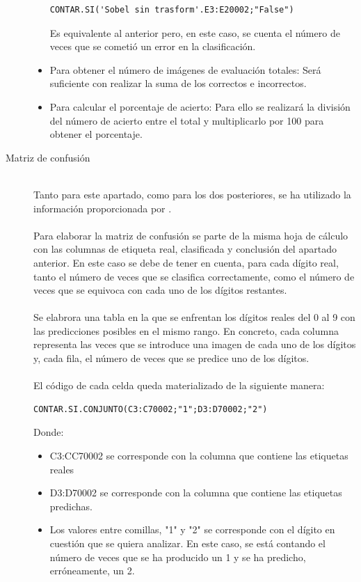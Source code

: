 \begin{description}
\begin{itemize}
{		\begin{lstlisting}[frame=single]
			CONTAR.SI('Sobel sin trasform'.E3:E20002;"False")
		\end{lstlisting}
		Es equivalente al anterior pero, en este caso, se cuenta el número de veces que se cometió un error en la clasificación.
	}
	\item{Para obtener el número de imágenes de evaluación totales: Será suficiente con realizar la suma de los correctos e incorrectos.
	}
	\item{Para calcular el porcentaje de acierto: Para ello se realizará la división del número de acierto entre el total y multiplicarlo por 100 para obtener el porcentaje.
	}
	\end{itemize}
	\vspace{15pt}
	\item[Matriz de confusión] \hfill 
	\vspace{10pt}
	\\
	Tanto para este apartado, como para los dos posteriores, se ha utilizado la información proporcionada por \cite{metrics}.\\
	\vspace{-10pt}
	\\
	Para elaborar la matriz de confusión se parte de la misma hoja de cálculo con las columnas de etiqueta real, clasificada y conclusión del apartado anterior. En este caso se debe de tener en cuenta, para cada dígito real, tanto el número de veces que se clasifica correctamente, como el número de veces que se equivoca con cada uno de los dígitos restantes.\\
	\vspace{-10pt}
	\\
	Se elabrora una tabla en la que se enfrentan los dígitos reales del 0 al 9 con las predicciones posibles en el mismo rango. En concreto, cada columna representa las veces que se introduce una imagen de cada uno de los dígitos y, cada fila, el número de veces que se predice uno de los dígitos.\\
	\vspace{20pt}
	\\
	El código de cada celda queda materializado de la siguiente manera:
	\vspace{10pt}
	\begin{lstlisting}[frame=single]
		CONTAR.SI.CONJUNTO(C3:C70002;"1";D3:D70002;"2")
	\end{lstlisting}
	Donde:
	\begin{itemize}
		\item C3:CC70002 se corresponde con la columna que contiene las etiquetas reales
		\item D3:D70002 se corresponde con la columna que contiene las etiquetas predichas.
		\item Los valores entre comillas, "1" y "2" se corresponde con el dígito en cuestión que se quiera analizar. En este caso, se está contando el número de veces que se ha producido un 1 y se ha predicho, erróneamente, un 2.
	\end{itemize}
	

\end{description}
